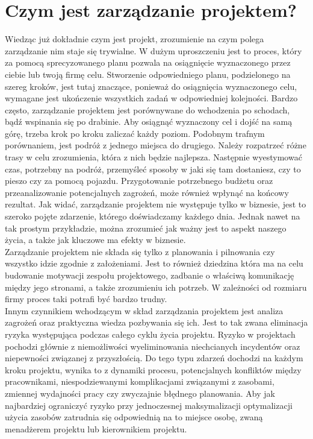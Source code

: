 \documentclass[oneside,polski,logo]{amuthesis}
\begin{document}
\section {Czym jest zarządzanie projektem?}
Wiedząc już dokładnie czym jest projekt, zrozumienie na czym polega zarządzanie nim staje się trywialne. W dużym uproszczeniu jest to proces, który za pomocą sprecyzowanego planu pozwala na osiągnięcie wyznaczonego przez ciebie lub twoją firmę celu. Stworzenie odpowiedniego planu, podzielonego na szereg kroków, jest tutaj znaczące, ponieważ do osiągnięcia wyznaczonego celu, wymagane jest ukończenie wszystkich zadań w odpowiedniej kolejności. Bardzo często, zarządzanie projektem jest porównywane do wchodzenia po schodach, bądź wspinania się po drabinie. Aby osiągnąć wyznaczony cel i dojść na samą górę, trzeba krok po kroku zaliczać każdy poziom. Podobnym trafnym porównaniem, jest podróż z jednego miejsca do drugiego. Należy rozpatrzeć różne trasy w celu zrozumienia, która z nich będzie najlepsza. Następnie wyestymować czas, potrzebny na podróż, przemyśleć sposoby w jaki się tam dostaniesz, czy to pieszo czy za pomocą pojazdu. Przygotowanie potrzebnego budżetu oraz przeanalizowanie potencjalnych zagrożeń, może również wpłynąć na końcowy rezultat. Jak widać, zarządzanie projektem nie występuje tylko w biznesie, jest to szeroko pojęte zdarzenie, którego doświadczamy każdego dnia. Jednak nawet na tak prostym przykładzie, można zrozumieć jak ważny jest to aspekt naszego życia, a także jak kluczowe ma efekty w biznesie.\cite{zarzadzanie7}\\
 
Zarządzanie projektem nie składa się tylko z planowania i pilnowania czy wszystko idzie zgodnie z założeniami. Jest to również dziedzina która ma na celu budowanie motywacji zespołu projektowego, zadbanie o właściwą komunikację między jego stronami, a także zrozumieniu ich potrzeb. W zależności od rozmiaru firmy proces taki potrafi być bardzo trudny.\\

Innym czynnikiem wchodzącym w skład zarządzania projektem jest analiza zagrożeń oraz praktyczna wiedza pozbywania się ich. Jest to tak zwana eliminacja ryzyka występująca podczas całego cyklu życia projektu. Ryzyko w projektach pochodzi głównie z niemożliwości wyeliminowania niechcianych incydentów oraz niepewności związanej z przyszłością. Do tego typu zdarzeń dochodzi na każdym kroku projektu, wynika to z dynamiki procesu, potencjalnych konfliktów między pracownikami, niespodziewanymi komplikacjami związanymi z zasobami, zmiennej wydajności pracy czy zwyczajnie błędnego planowania. Aby jak najbardziej ograniczyć ryzyko przy jednoczesnej maksymalizacji optymalizacji użycia zasobów zatrudnia się odpowiednią na to miejsce osobę, zwaną menadżerem projektu lub kierownikiem projektu.\\
\end{document}
